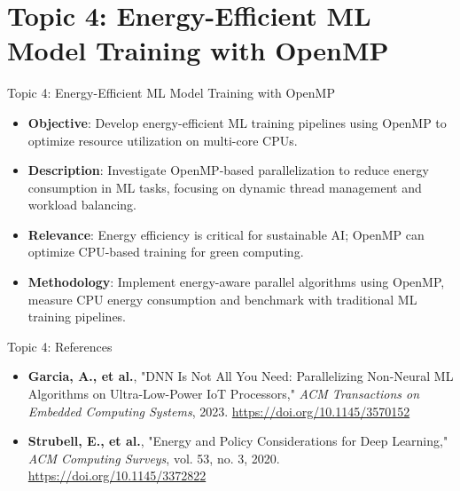 \documentclass{beamer}
\begin{document}
\section{Topic 4: Energy-Efficient ML Model Training with OpenMP}
\begin{frame}{Topic 4: Energy-Efficient ML Model Training with OpenMP}
\begin{itemize}
    \item \textbf{Objective}: Develop energy-efficient ML training pipelines using OpenMP to optimize resource utilization on multi-core CPUs.
    \item \textbf{Description}: Investigate OpenMP-based parallelization to reduce energy consumption in ML tasks, focusing on dynamic thread management and workload balancing.
    \item \textbf{Relevance}: Energy efficiency is critical for sustainable AI; OpenMP can optimize CPU-based training for green computing.
    \item \textbf{Methodology}: Implement energy-aware parallel algorithms 
    using OpenMP, measure CPU energy consumption and benchmark with traditional ML training pipelines.
\end{itemize}
\end{frame}

\begin{frame}{Topic 4: References}
\begin{itemize}
    \item \textbf{Garcia, A., et al.}, "DNN Is Not All You Need: Parallelizing Non-Neural ML Algorithms on Ultra-Low-Power IoT Processors," \textit{ACM Transactions on Embedded Computing Systems}, 2023. \url{https://doi.org/10.1145/3570152}
    \item \textbf{Strubell, E., et al.}, "Energy and Policy Considerations for Deep Learning," \textit{ACM Computing Surveys}, vol. 53, no. 3, 2020. \url{https://doi.org/10.1145/3372822}

\end{itemize}
\end{frame}
\end{document}
